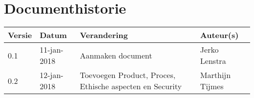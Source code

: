 \section{Documenthistorie}

\begin{tabularx}{\textwidth}{| l | l | X | l |}
    \hline
    \textbf{Versie} & \textbf{Datum} & \textbf{Verandering} & \textbf{Auteur(s)}
    \\ \hline
    0.1	& 11-jan-2018 & Aanmaken document & Jerko Lenstra \\ \hline
    0.2 & 12-jan-2018 & Toevoegen Product, Proces, Ethische aspecten en Security
     & Marthijn Tijmes \\ \hline

\end{tabularx}
